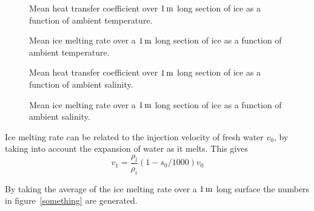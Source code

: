 	\begin{figure}[h]
		\begin{center}
			\setlength\figureheight{6cm} 
			\setlength\figurewidth{9cm} 
			
		\end{center}
		\caption{Mean heat transfer coefficient over $\unit[1]{m}$ long section of ice as a function of ambient temperature.}
		\label{fig:h_Tinf}
	\end{figure}
	
	\begin{figure}[h]
		\begin{center}
			\setlength\figureheight{6cm} 
			\setlength\figurewidth{9cm} 
			
		\end{center}
		\caption{Mean ice melting rate over a $\unit[1]{m}$ long section of ice as a function of ambient temperature.}
		\label{fig:Mdot_Tinf}
	\end{figure}

	\begin{figure}[h]
		\begin{center}
			\setlength\figureheight{6cm} 
			\setlength\figurewidth{9cm} 
			
		\end{center}
		\caption{Mean heat transfer coefficient over $\unit[1]{m}$ long section of ice as a function of ambient salinity.}
		\label{fig:h_sinf}
	\end{figure}

	\begin{figure}[h]
		\begin{center}
			\setlength\figureheight{6cm} 
			\setlength\figurewidth{9cm} 
			
		\end{center}
		\caption{Mean ice melting rate over a $\unit[1]{m}$ long section of ice as a function of ambient salinity.}
		\label{fig:Mdot_sinf}
	\end{figure}


	Ice melting rate can be related to the injection velocity of fresh water $v_0$, by taking into account the expansion of water as it melts. This gives
	\begin{equation*}
	  v_1 = \frac{\rho_l}{\rho_i}(1-s_0/1000)v_0
	\end{equation*}

	By taking the average of the ice melting rate over a $\unit[1]{m}$ long surface the numbers in figure~\ref{something} are generated.

